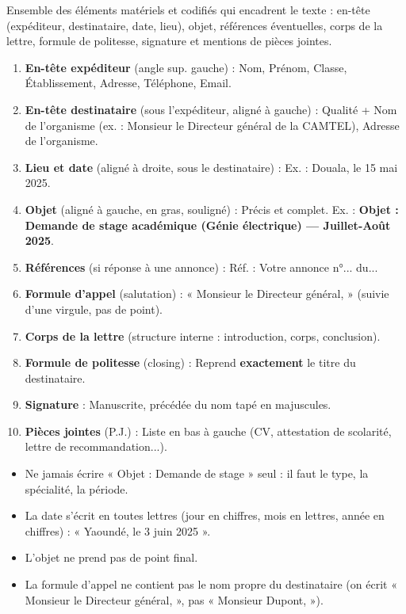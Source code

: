 \documentclass[11pt]{article}
\begin{document}
\begin{definition}
Ensemble des éléments matériels et codifiés qui encadrent le texte : en-tête (expéditeur, destinataire, date, lieu), objet, références éventuelles, corps de la lettre, formule de politesse, signature et mentions de pièces jointes.
\end{definition}

\begin{methode}
\begin{enumerate}
\item \textbf{En-tête expéditeur} (angle sup. gauche) : Nom, Prénom, Classe, Établissement, Adresse, Téléphone, Email.
\item \textbf{En-tête destinataire} (sous l'expéditeur, aligné à gauche) : Qualité + Nom de l'organisme (ex. : Monsieur le Directeur général de la CAMTEL), Adresse de l'organisme.
\item \textbf{Lieu et date} (aligné à droite, sous le destinataire) : Ex. : Douala, le 15 mai 2025.
\item \textbf{Objet} (aligné à gauche, en gras, souligné) : Précis et complet. Ex. : \textbf{Objet : Demande de stage académique (Génie électrique) — Juillet-Août 2025}.
\item \textbf{Références} (si réponse à une annonce) : Réf. : Votre annonce n°... du...
\item \textbf{Formule d'appel} (salutation) : « Monsieur le Directeur général, » (suivie d'une virgule, pas de point).
\item \textbf{Corps de la lettre} (structure interne : introduction, corps, conclusion).
\item \textbf{Formule de politesse} (closing) : Reprend \textbf{exactement} le titre du destinataire.
\item \textbf{Signature} : Manuscrite, précédée du nom tapé en majuscules.
\item \textbf{Pièces jointes} (P.J.) : Liste en bas à gauche (CV, attestation de scolarité, lettre de recommandation...).
\end{enumerate}
\end{methode}

\begin{attention}
\begin{itemize}
\item Ne jamais écrire « Objet : Demande de stage » seul : il faut le type, la spécialité, la période.
\item La date s'écrit en toutes lettres (jour en chiffres, mois en lettres, année en chiffres) : « Yaoundé, le 3 juin 2025 ».
\item L'objet ne prend pas de point final.
\item La formule d'appel ne contient pas le nom propre du destinataire (on écrit « Monsieur le Directeur général, », pas « Monsieur Dupont, »).
\end{itemize}
\end{attention}
\end{document}
